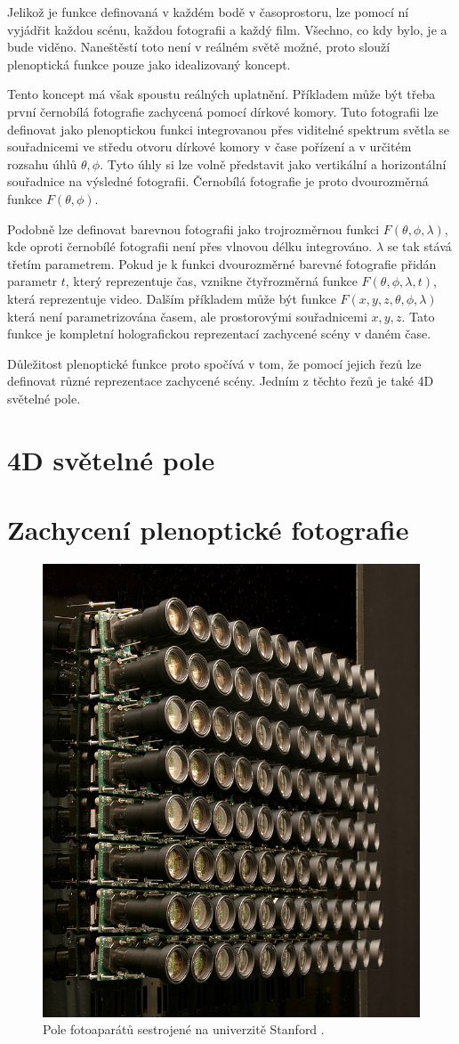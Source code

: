 Jelikož je funkce definovaná v každém bodě v časoprostoru, lze pomocí ní vyjádřit každou scénu, každou fotografii a každý film.
Všechno, co kdy bylo, je a bude viděno.
Naneštěstí toto není v reálném světě možné, proto slouží plenoptická funkce pouze jako idealizovaný koncept.

Tento koncept má však spoustu reálných uplatnění. Příkladem může být třeba první černobílá fotografie zachycená pomocí dírkové komory.
Tuto fotografii lze definovat jako plenoptickou funkci integrovanou přes viditelné spektrum světla se souřadnicemi ve středu otvoru dírkové komory v čase pořízení a v určitém rozsahu úhlů $\theta, \phi$.
Tyto úhly si lze volně představit jako vertikální a horizontální souřadnice na výsledné fotografii.
Černobílá fotografie je proto dvourozměrná funkce $F(\theta, \phi)$.

Podobně lze definovat barevnou fotografii jako trojrozměrnou funkci $F(\theta, \phi, \lambda)$, kde oproti černobílé fotografii není přes vlnovou délku integrováno.
$\lambda$ se tak stává třetím parametrem.
Pokud je k funkci dvourozměrné barevné fotografie přidán parametr $t$, který reprezentuje čas, vznikne čtyřrozměrná funkce $F(\theta, \phi, \lambda, t)$, která reprezentuje video.
Dalším příkladem může být funkce $F(x, y, z, \theta, \phi, \lambda)$ která není parametrizována časem, ale prostorovými souřadnicemi $x, y, z$.
Tato funkce je kompletní holografickou reprezentací zachycené scény v daném čase.

Důležitost plenoptické funkce proto spočívá v tom, že pomocí jejich řezů lze definovat různé reprezentace zachycené scény.
Jedním z těchto řezů je také 4D světelné pole.

\section{4D světelné pole}
\label{4D-light-field}

\section{Zachycení plenoptické fotografie}
\label{light-field-capture}
\begin{figure}[h]
  \centering
  \includegraphics[width=.4\textwidth]{obrazky-figures/stanford-array.jpg}
	\caption{Pole fotoaparátů sestrojené na univerzitě Stanford \cite{stanford}.}
	\label{stanfordArray}
\end{figure}

